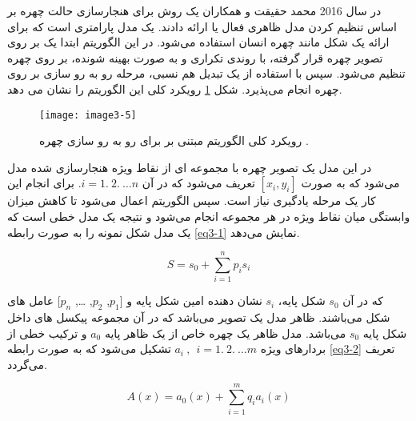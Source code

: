 \noindent
در سال 2016 محمد حقیقت و همکاران \cite{HAGHIGHAT201623} یک روش برای هنجارسازی حالت چهره بر اساس تنظیم کردن مدل  ظاهری فعال  یا  ارائه دادند.  یک مدل پارامتری است که برای ارائه یک شکل مانند چهره انسان استفاده می‌شود. در این الگوریتم ابتدا یک  بر روی تصویر چهره قرار گرفته، با روندی تکراری و به صورت بهینه شونده، بر روی چهره تنظیم می‌شود. سپس با استفاده از یک تبدیل هم نسبی، مرحله رو به رو سازی بر روی چهره انجام می‌پذیرد. شکل \ref{image3-5} رویکرد کلی این الگوریتم را نشان می دهد. 

\begin{figure}[h]
\centering
  \texttt{[image: image3-5]}
  \caption{رویکرد کلی الگوریتم مبتنی بر  برای رو به رو سازی چهره \cite{HAGHIGHAT201623}.}
  \label{image3-5}
\end{figure}

\noindent
در این مدل یک تصویر چهره با مجموعه ای از نقاط ویژه هنجارسازی شده مدل می‌شود که به صورت $[x_i , y_i]$ تعریف می‌شود که در آن $i=1.\ 2.\ \ldots n $. برای انجام این کار یک مرحله یادگیری نیاز است. سپس الگوریتم  اعمال می‌شود تا کاهش میزان وابستگی میان نقاط ویژه در هر مجموعه انجام می‌شود و نتیجه یک مدل خطی است که یک مدل شکل نمونه را به صورت رابطه \ref{eq3-1} نمایش می‌دهد.

\begin{equation}\label{eq3-1}
S=s_0+\sum_{i=1}^{n}{p_is_i}
\end{equation}

\noindent
که در آن $s_0$ شکل پایه، $s_i$ نشان دهنده  امین شکل پایه و [$p_1$, $p_2$, \ldots, $p_n$] عامل های شکل می‌باشند. ظاهر  مدل  یک تصویر  می‌باشد که در آن  مجموعه پیکسل های داخل شکل پایه $s_0$ می‌باشد. مدل ظاهر یک چهره خاص از یک ظاهر پایه $a_0$ و ترکیب خطی از بردارهای ویژه
$a_i\ ,\ \ i=1.\ 2.\ \ldots m$
تشکیل می‌شود که به صورت رابطه \ref{eq3-2} تعریف می‌گردد.

\begin{equation}\label{eq3-2}
A(x)=a_0(x)+\sum_{i=1}^{m}{q_ia_i(x)}
\end{equation}


